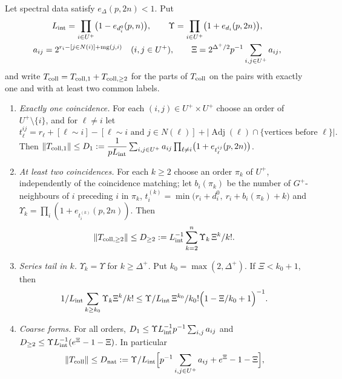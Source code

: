 \begin{lemma}\label{lem:oct24-collision}
Let spectral data satisfy $e_\Delta(p,2n)<1$. Put
\[
\begin{gathered}
 L_{\rm int}=\prod_{i\in U^+}\bigl(1-e_{d^0_i}(p,n)\bigr),\qquad
 \Upsilon=\prod_{i\in U^+}\bigl(1+e_{d_i}(p,2n)\bigr),\\
 a_{ij}=2^{r_i-[j\in N(i)]+\mathrm{mg}(j,i)}\quad(i,j\in U^+),\qquad
 \Xi=2^{\Delta^+/2}p^{-1}\sum_{i,j\in U^+}a_{ij},
\end{gathered}
\]
and write $T_{\rm coll}=T_{\rm coll,1}+T_{\rm coll,\ge2}$ for the parts of
$T_{\rm coll}$ on the pairs with exactly one and with at least two common labels.
\begin{enumerate}[label=\textup{(\alph*)}]
\item \emph{Exactly one coincidence.} For each $(i,j)\in U^+\times U^+$ choose an
 order of $U^+\setminus\{i\}$, and for $\ell\ne i$ let
 \[
  t^{ij}_\ell=r_\ell+[\ell\sim i]-[\ell\sim i\text{ and }j\in N(\ell)]
  +|\operatorname{Adj}(\ell)\cap\{\text{vertices before }\ell\}|.
 \]
 Then
 $\norm{T_{\rm coll,1}}\le D_1:=\dfrac1{pL_{\rm int}}\sum_{i,j\in U^+}a_{ij}
 \prod_{\ell\ne i}\bigl(1+e_{t^{ij}_\ell}(p,2n)\bigr)$.
\item \emph{At least two coincidences.} For each $k\ge2$ choose an order $\pi_k$
 of $U^+$, independently of the coincidence matching; let $b_i(\pi_k)$ be the
 number of $G^+$-neighbours of $i$ preceding $i$ in $\pi_k$,
 $t^{(k)}_i=\min\bigl(r_i+d^0_i,\ r_i+b_i(\pi_k)+k\bigr)$ and
 $\Upsilon_k=\prod_i(1+e_{t^{(k)}_i}(p,2n))$. Then
 \begin{equation}\label{eq:oct24-collision}
  \norm{T_{\rm coll,\ge2}}\le D_{\ge2}:=L_{\rm int}^{-1}\sum_{k=2}^n\Upsilon_k\,
  \frac{\Xi^k}{k!}.
 \end{equation}
\item \emph{Series tail in $k$.} $\Upsilon_k=\Upsilon$ for
 $k\ge\Delta^+$. Put
 $k_0=\max(2,\Delta^+)$. If $\Xi<k_0+1$, then
 \[
  \frac1{L_{\rm int}}\sum_{k\ge k_0}\Upsilon_k\frac{\Xi^k}{k!}\le
  \frac\Upsilon{L_{\rm int}}\,\frac{\Xi^{k_0}}{k_0!}\Bigl(1-\frac\Xi{k_0+1}\Bigr)^{-1}.
 \]
\item \emph{Coarse forms.} For all orders,
 $D_1\le\Upsilon L_{\rm int}^{-1}p^{-1}\sum_{i,j}a_{ij}$ and
 $D_{\ge2}\le\Upsilon L_{\rm int}^{-1}(e^\Xi-1-\Xi)$. In particular
 \begin{equation}\label{eq:collision-natural}
  \norm{T_{\rm coll}}\le D_{\rm nat}:=\frac\Upsilon{L_{\rm int}}
  \Bigl[p^{-1}\sum_{i,j\in U^+}a_{ij}+e^\Xi-1-\Xi\Bigr],

\end{equation}
\end{enumerate}
\end{lemma}
